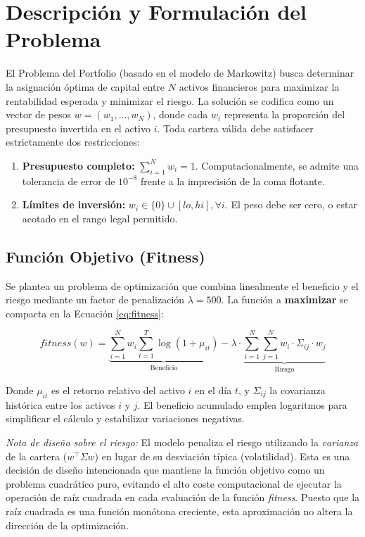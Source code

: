 \section{Descripción y Formulación del Problema}
\label{sec:formulacion}

El Problema del Portfolio (basado en el modelo de Markowitz) busca determinar la asignación óptima de capital entre $N$ activos financieros para maximizar la rentabilidad esperada y minimizar el riesgo. La solución se codifica como un vector de pesos $w = (w_1, \dots, w_N)$, donde cada $w_i$ representa la proporción del presupuesto invertida en el activo $i$. Toda cartera válida debe satisfacer estrictamente dos restricciones:
\begin{enumerate}[noitemsep]
    \item \textbf{Presupuesto completo:} $\sum_{i=1}^{N} w_i = 1$. Computacionalmente, se admite una tolerancia de error de $10^{-8}$ frente a la imprecisión de la coma flotante.
    \item \textbf{Límites de inversión:} $w_i \in \{0\} \cup [lo, hi], \forall i$. El peso debe ser cero, o estar acotado en el rango legal permitido.
\end{enumerate}

\subsection{Función Objetivo (Fitness)}
Se plantea un problema de optimización que combina linealmente el beneficio y el riesgo mediante un factor de penalización $\lambda = 500$. La función a \textbf{maximizar} se compacta en la Ecuación \ref{eq:fitness}:

\begin{equation}
    fitness(w) = \underbrace{\sum_{i=1}^{N} w_i \sum_{t=1}^{T} \log(1+\mu_{it})}_{\text{Beneficio}} - \lambda \cdot \underbrace{\sum_{i=1}^{N} \sum_{j=1}^{N} w_i \cdot \Sigma_{ij} \cdot w_j}_{\text{Riesgo}}
    \label{eq:fitness}
\end{equation}

Donde $\mu_{it}$ es el retorno relativo del activo $i$ en el día $t$, y $\Sigma_{ij}$ la covarianza histórica entre los activos $i$ y $j$. El beneficio acumulado emplea logaritmos para simplificar el cálculo y estabilizar variaciones negativas.

\textit{Nota de diseño sobre el riesgo:} El modelo penaliza el riesgo utilizando la \textit{varianza} de la cartera ($w^\top \Sigma w$) en lugar de su desviación típica (volatilidad). Esta es una decisión de diseño intencionada que mantiene la función objetivo como un problema cuadrático puro, evitando el alto coste computacional de ejecutar la operación de raíz cuadrada en cada evaluación de la función \textit{fitness}. Puesto que la raíz cuadrada es una función monótona creciente, esta aproximación no altera la dirección de la optimización.

